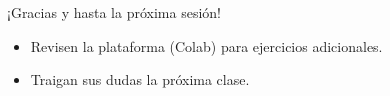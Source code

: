 \documentclass[10pt]{beamer}
\begin{document}
\begin{frame}
  \huge{\centerline{¡Gracias y hasta la próxima sesión!}}
  \vspace{0.5cm}
  \normalsize
  \begin{itemize}
    \item Revisen la plataforma (Colab) para ejercicios adicionales.
    \item Traigan sus dudas la próxima clase.
  \end{itemize}
\end{frame}
\end{document}
